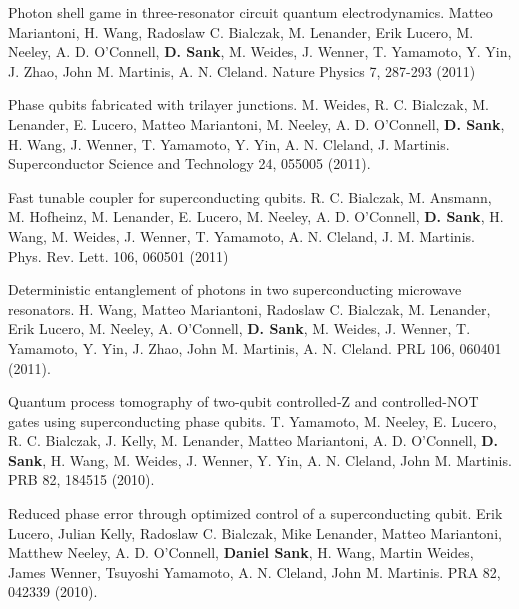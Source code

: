 \documentclass[margin=2cm,line]{res}
\begin{document}
\begin{resume}
\begin{list3}
\item Photon shell game in three-resonator circuit quantum electrodynamics. Matteo Mariantoni, H. Wang, Radoslaw C. Bialczak, M. Lenander, Erik Lucero, M. Neeley, A. D. O'Connell, \textbf{D. Sank}, M. Weides, J. Wenner, T. Yamamoto, Y. Yin, J. Zhao, John M. Martinis, A. N. Cleland. Nature Physics 7, 287-293 (2011) \\

\item Phase qubits fabricated with trilayer junctions. M. Weides, R. C. Bialczak, M. Lenander, E. Lucero, Matteo Mariantoni, M. Neeley, A. D. O'Connell, \textbf{D. Sank}, H. Wang, J. Wenner, T. Yamamoto, Y. Yin, A. N. Cleland, J. Martinis. Superconductor Science and Technology 24, 055005 (2011). \\

\item Fast tunable coupler for superconducting qubits. R. C. Bialczak, M. Ansmann, M. Hofheinz, M. Lenander, E. Lucero, M. Neeley, A. D. O'Connell, \textbf{D. Sank}, H. Wang, M. Weides, J. Wenner, T. Yamamoto, A. N. Cleland, J. M. Martinis. Phys. Rev. Lett. 106, 060501 (2011) \\

\item Deterministic entanglement of photons in two superconducting microwave resonators. H. Wang, Matteo Mariantoni, Radoslaw C. Bialczak, M. Lenander, Erik Lucero, M. Neeley, A. O'Connell, \textbf{D. Sank}, M. Weides, J. Wenner, T. Yamamoto, Y. Yin, J. Zhao, John M. Martinis, A. N. Cleland. PRL 106, 060401 (2011). \\

\item Quantum process tomography of two-qubit controlled-Z and controlled-NOT gates using superconducting phase qubits. T. Yamamoto, M. Neeley, E. Lucero, R. C. Bialczak, J. Kelly, M. Lenander, Matteo Mariantoni, A. D. O'Connell, \textbf{D. Sank}, H. Wang, M. Weides, J. Wenner, Y. Yin, A. N. Cleland, John M. Martinis. PRB 82, 184515 (2010). \\

\item Reduced phase error through optimized control of a superconducting qubit. Erik Lucero, Julian Kelly, Radoslaw C. Bialczak, Mike Lenander, Matteo Mariantoni, Matthew Neeley, A. D. O'Connell, \textbf{Daniel Sank}, H. Wang, Martin Weides, James Wenner, Tsuyoshi Yamamoto, A. N. Cleland, John M. Martinis. PRA 82, 042339 (2010). \\


\end{list3}
\end{resume}
\end{document}
